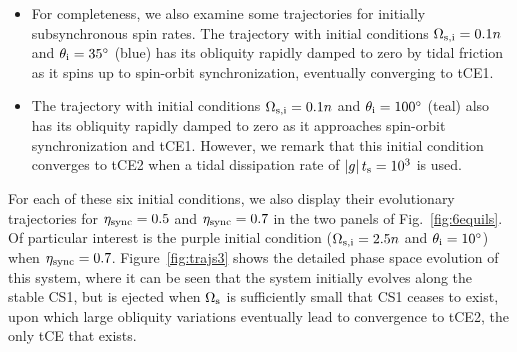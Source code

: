 \documentclass[
        fleqn,
        usenatbib,
    ]{mnras}
\newcommand*{\abs}[1]{\left|#1\right|}
\begin{document}
\begin{itemize}
    \item For completeness, we also examine some trajectories for initially
        subsynchronous spin rates. The trajectory with initial conditions
        $\Omega_{\rm s, i} = 0.1n$ and $\theta_{\rm i} = 35^\circ$ (blue) has its
        obliquity rapidly damped to zero by tidal friction as it spins up to
        spin-orbit synchronization, eventually converging to tCE1.

    \item The trajectory with initial conditions $\Omega_{\rm s, i} = 0.1n$ and
        $\theta_{\rm i} = 100^\circ$ (teal) also has its obliquity rapidly
        damped to zero as it approaches spin-orbit synchronization and tCE1.
        However, we remark that this initial condition converges to tCE2 when a
        tidal dissipation rate of $\abs{g}t_{\rm s} = 10^3$ is used.
\end{itemize}
For each of these six initial conditions, we also display their evolutionary
trajectories for $\eta_{\rm sync} = 0.5$ and $\eta_{\rm sync} = 0.7$ in the two
panels of Fig.~\ref{fig:6equils}. Of particular interest is the purple initial
condition ($\Omega_{\rm s, i} = 2.5n$ and $\theta_{\rm i} = 10^\circ$) when
$\eta_{\rm sync} = 0.7$. Figure~\ref{fig:trajs3} shows the detailed phase space
evolution of this system, where it can be seen that the system initially evolves
along the stable CS1, but is ejected when $\Omega_{\rm s}$ is sufficiently small
that CS1 ceases to exist, upon which large obliquity variations eventually lead
to convergence to tCE2, the only tCE that exists.
\end{document}
